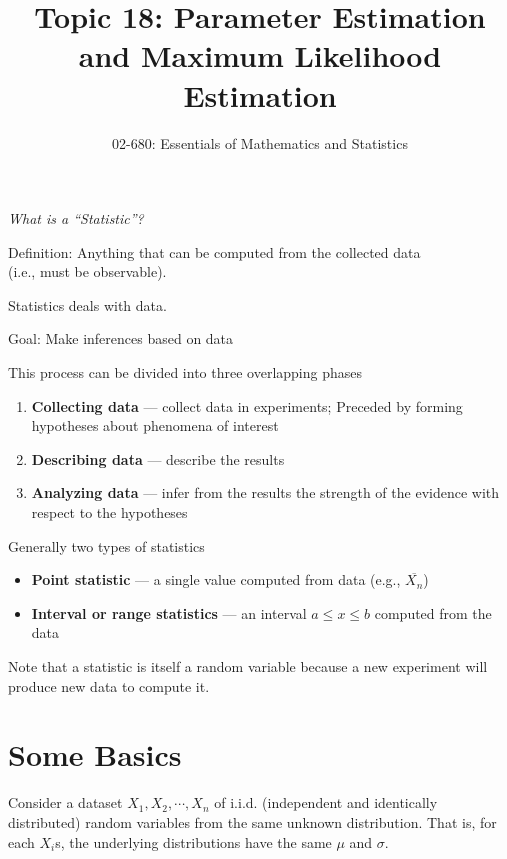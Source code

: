 

\title{Topic 18: Parameter Estimation and Maximum Likelihood Estimation}
\author{02-680: Essentials of Mathematics and Statistics}


\maketitle


\emph{What is a ``Statistic''?}
\begin{center}
Definition: Anything that can be computed from the collected data\\ (i.e., must be observable).
\end{center}

Statistics deals with data.

Goal: Make inferences based on data

This process can be divided into three overlapping phases
\begin{enumerate}
\item \textbf{Collecting data} --- collect data in experiments; Preceded by forming hypotheses about phenomena of interest 
\item \textbf{Describing data} --- describe the results
\item \textbf{Analyzing data} --- infer from the results the strength of the evidence with respect to the hypotheses
\end{enumerate}

Generally two types of statistics
\begin{itemize}
\item[] \textbf{Point statistic} --- a single value computed from data (e.g., $\overline{X_n}$)
\item[] \textbf{Interval or range statistics} ---  an interval $a\le x \le b$ computed from the data
\end{itemize} 

Note that a statistic is itself a random variable 
because a new experiment will produce new data to compute it.

\section{Some Basics}

Consider a dataset $X_1, X_2, \cdots, X_n$ of i.i.d. (independent and identically distributed) random variables from the same unknown distribution. 
That is, for each $X_i$s, the underlying distributions have the same $\mu$ and $\sigma$. 

